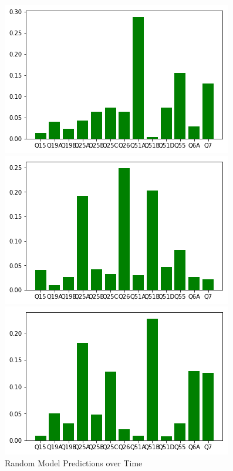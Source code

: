 {\begin{figure}[t!]
	\caption{Random Model Predictions over Time}
	\label{fig:predictions}
	\begin{minipage}{0.24\textwidth}
		\includegraphics[width=\linewidth]{Images/random_pred_2005.png}
	\end{minipage}\hfill
	\begin{minipage}{0.24\textwidth}
		\includegraphics[width=\linewidth]{Images/random_pred_2008.png}
	\end{minipage}\hfill
	\begin{minipage}{0.24\textwidth}%
		\includegraphics[width=\linewidth]{Images/random_pred_2011.png}

\end{minipage}
\end{figure}}
